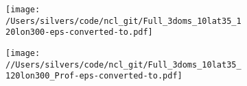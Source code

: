 \documentclass[varwidth, border=10pt]{standalone}
\begin{document}

\begin{figure}
  \centering
  \begin{subfigure}{0.5\textwidth}
  \centering
    \texttt{[image: /Users/silvers/code/ncl\_git/Full\_3doms\_10lat35\_120lon300-eps-converted-to.pdf]}
 \end{subfigure}
\begin{subfigure}{0.31\textwidth}
\centering
  \texttt{[image: //Users/silvers/code/ncl\_git/Full\_3doms\_10lat35\_120lon300\_Prof-eps-converted-to.pdf]}
\end{subfigure}
 \end{figure}
\end{document}
